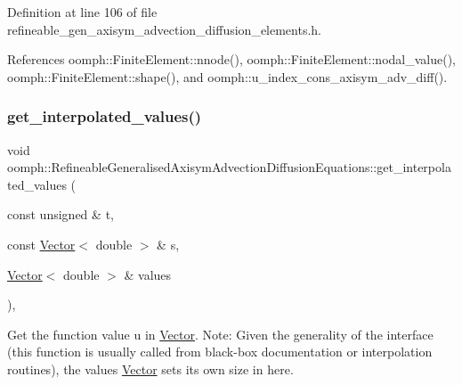 Definition at line 106 of file refineable\+\_\+gen\+\_\+axisym\+\_\+advection\+\_\+diffusion\+\_\+elements.\+h.



References oomph\+::\+Finite\+Element\+::nnode(), oomph\+::\+Finite\+Element\+::nodal\+\_\+value(), oomph\+::\+Finite\+Element\+::shape(), and oomph\+::u\+\_\+index\+\_\+cons\+\_\+axisym\+\_\+adv\+\_\+diff().

\mbox{\label{classoomph_1_1RefineableGeneralisedAxisymAdvectionDiffusionEquations_a2f7d7da51b9088a7e306692f709f9eed}} 
\subsubsection{\texorpdfstring{get\+\_\+interpolated\+\_\+values()}{get\_interpolated\_values()}\hspace{0.1cm}{\footnotesize\ttfamily [2/2]}}
{\footnotesize\ttfamily void oomph\+::\+Refineable\+Generalised\+Axisym\+Advection\+Diffusion\+Equations\+::get\+\_\+interpolated\+\_\+values (\begin{DoxyParamCaption}\item[{const unsigned \&}]{t,  }\item[{const \hyperlink{classoomph_1_1Vector}{Vector}$<$ double $>$ \&}]{s,  }\item[{\hyperlink{classoomph_1_1Vector}{Vector}$<$ double $>$ \&}]{values }\end{DoxyParamCaption})\hspace{0.3cm}{\ttfamily [inline]}, {\ttfamily [virtual]}}



Get the function value u in \hyperlink{classoomph_1_1Vector}{Vector}. Note\+: Given the generality of the interface (this function is usually called from black-\/box documentation or interpolation routines), the values \hyperlink{classoomph_1_1Vector}{Vector} sets its own size in here. 




